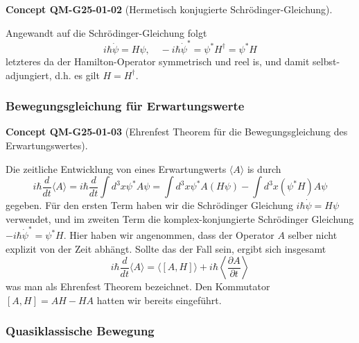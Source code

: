 \documentclass[10pt, letterpaper]{article}
\newcommand{\CustomHeading}[3]{%
  \par\medskip\noindent%
  \textbf{#1 #2} \textnormal{(#3)}.\enskip%
}
\newenvironment{CONC}[2]{\begin{unitbox}\CustomHeading{Concept}{#1}{#2}}{\end{unitbox}}
\begin{document}
\begin{CONC}{QM-G25-01-02}{Hermetisch konjugierte Schrödinger-Gleichung}
Angewandt auf die Schrödinger-Gleichung folgt
$$
i \hbar \dot{\psi}=H \psi, \quad-i \hbar \dot{\psi}^{*}=\psi^{*} H^{\dagger}=\psi^{*} H
$$
letzteres da der Hamilton-Operator symmetrisch und reel is, und damit selbst-adjungiert, d.h. es gilt $H=H^{\dagger}$.
\end{CONC}



\subsubsection*{Bewegungsgleichung für Erwartungswerte}


\begin{CONC}{QM-G25-01-03}{Ehrenfest Theorem für die Bewegungsgleichung des Erwartungswertes}
Die zeitliche Entwicklung von eines Erwartungwerts $\langle A\rangle$ is durch
$$
i \hbar \frac{d}{d t}\langle A\rangle=i \hbar \frac{d}{d t} \int d^{3} x \psi^{*} A \psi=\int d^{3} x \psi^{*} A(H \psi)-\int d^{3} x\left(\psi^{*} H\right) A \psi
$$
gegeben. Für den ersten Term haben wir die Schrödinger Gleichung $i \hbar \dot{\psi}=H \psi$ verwendet, und im zweiten Term die komplex-konjungierte Schrödinger Gleichung $-i \hbar \dot{\psi}^{*}=\psi^{*} H$. Hier haben wir angenommen, dass der Operator $A$ selber nicht explizit von der Zeit abhängt. Sollte das der Fall sein, ergibt sich insgesamt
$$
i \hbar \frac{d}{d t}\langle A\rangle=\langle[A, H]\rangle+i \hbar\left\langle\frac{\partial A}{\partial t}\right\rangle
$$
was man als Ehrenfest Theorem bezeichnet. Den Kommutator $[A, H]=A H-H A$ hatten wir bereits eingeführt.
\end{CONC}



\subsubsection*{Quasiklassische Bewegung}
\end{document}
